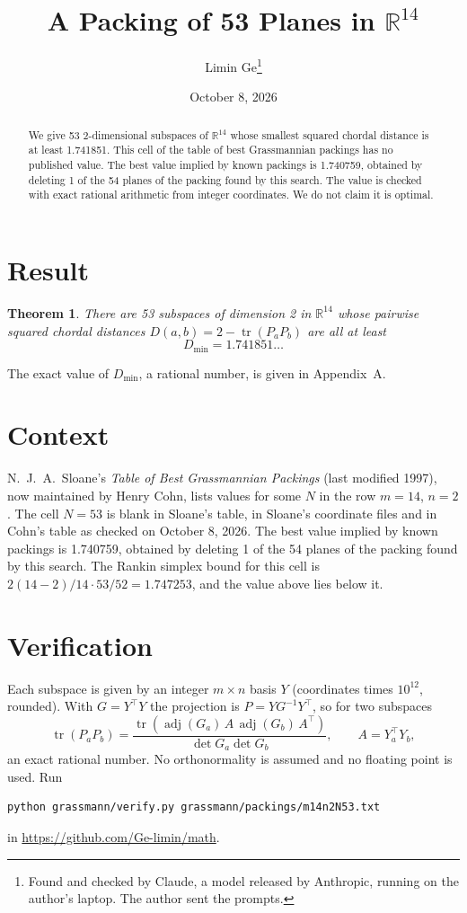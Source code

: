 \documentclass[11pt,a4paper]{article}
\title{A Packing of 53 Planes in $\mathbb{R}^{14}$}
\author{Limin Ge\thanks{Found and checked by Claude, a model released by Anthropic, running on the author's laptop. The author sent the prompts.}}
\date{October 8, 2026}
\newtheorem*{theorem}{Theorem}
\begin{document}
\maketitle
\begin{abstract}
We give 53 2-dimensional subspaces of $\mathbb{R}^{14}$ whose smallest squared chordal distance is at least 1.741851. This cell of the table of best Grassmannian packings has no published value. The best value implied by known packings is 1.740759, obtained by deleting 1 of the 54 planes of the packing found by this search. The value is checked with exact rational arithmetic from integer coordinates. We do not claim it is optimal.
\end{abstract}

\section{Result}
\begin{theorem}
There are 53 subspaces of dimension 2 in $\mathbb{R}^{14}$ whose pairwise squared chordal distances $D(a,b) = 2 - \operatorname{tr}(P_aP_b)$ are all at least
\[ D_{\min} = 1.741851\ldots \]
\end{theorem}
The exact value of $D_{\min}$, a rational number, is given in Appendix~A.


\section{Context}
N.~J.~A.~Sloane's \emph{Table of Best Grassmannian Packings} (last modified 1997), now maintained by Henry Cohn, lists values for some $N$ in the row $m=14$, $n=2$. The cell $N=53$ is blank in Sloane's table, in Sloane's coordinate files and in Cohn's table as checked on October 8, 2026. The best value implied by known packings is 1.740759, obtained by deleting 1 of the 54 planes of the packing found by this search. The Rankin simplex bound for this cell is $2(14-2)/14\cdot 53/52 = 1.747253$, and the value above lies below it.


\section{Verification}
Each subspace is given by an integer $m\times n$ basis $Y$ (coordinates times $10^{12}$, rounded). With $G=Y^\top Y$ the projection is $P=YG^{-1}Y^\top$, so for two subspaces
\[ \operatorname{tr}(P_aP_b)=\frac{\operatorname{tr}(\operatorname{adj}(G_a)\,A\,\operatorname{adj}(G_b)\,A^\top)}{\det G_a\det G_b},\qquad A=Y_a^\top Y_b, \]
an exact rational number. No orthonormality is assumed and no floating point is used. Run
\begin{verbatim}
python grassmann/verify.py grassmann/packings/m14n2N53.txt
\end{verbatim}
in \url{https://github.com/Ge-limin/math}.
\end{document}
